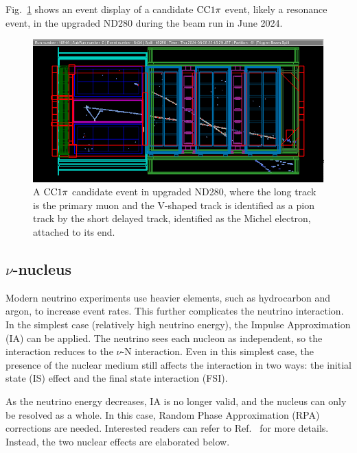Fig.~\ref{fig:cc1pi} shows an event display of a candidate $\textrm{CC}1\pi$ event, likely a resonance event, in the upgraded ND280 during the beam run in June 2024.

\begin{figure}[!htb] 	
    \centering 		
    \includegraphics[width=\sgfigwid\textwidth]{figures/shortME.png}
    \caption{\label{fig:cc1pi} A $\textrm{CC}1\pi$ candidate event in upgraded ND280, where the long track is the primary muon and the V-shaped track is identified as a pion track by the short delayed track, identified as the Michel electron, attached to its end.} 
\end{figure}

\subsection{$\nu$-nucleus}
Modern neutrino experiments use heavier elements, such as hydrocarbon and argon, to increase event rates.
This further complicates the neutrino interaction.
In the simplest case (relatively high neutrino energy), the Impulse Approximation (IA) can be applied.
The neutrino sees each nucleon as independent, so the interaction reduces to the $\nu$-N interaction.
Even in this simplest case, the presence of the nuclear medium still affects the interaction in two ways: the initial state (IS) effect and the final state interaction (FSI).

As the neutrino energy decreases, IA is no longer valid, and the nucleus can only be resolved as a whole.
In this case, Random Phase Approximation (RPA) corrections are needed.
Interested readers can refer to Ref.~\cite{SajjadAthar:2022pjt} for more details.
Instead, the two nuclear effects are elaborated below.

